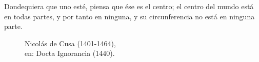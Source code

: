 \documentclass[
11pt, %
spanish,
singlespacing, %
parskip, %
headsepline, %
]{MastersDoctoralThesis} %
\begin{document}
{\larger


\hspace{20mm}Dondequiera que uno esté, piensa que ése es el centro; el centro del mundo está en todas partes, y por tanto en ninguna, y su circunferencia no está en ninguna parte.\\

\begin{figure}[H]
  \begin{minipage}[b]{0.6\textwidth}
	  \vspace{0cm}
  \end{minipage}
  \hfill
  \begin{minipage}[b]{0.4\textwidth}
		Nicolás de Cusa (1401-1464),\\
		en: Docta Ignorancia (1440).\\
  \end{minipage}
\end{figure}





}
\end{document}

